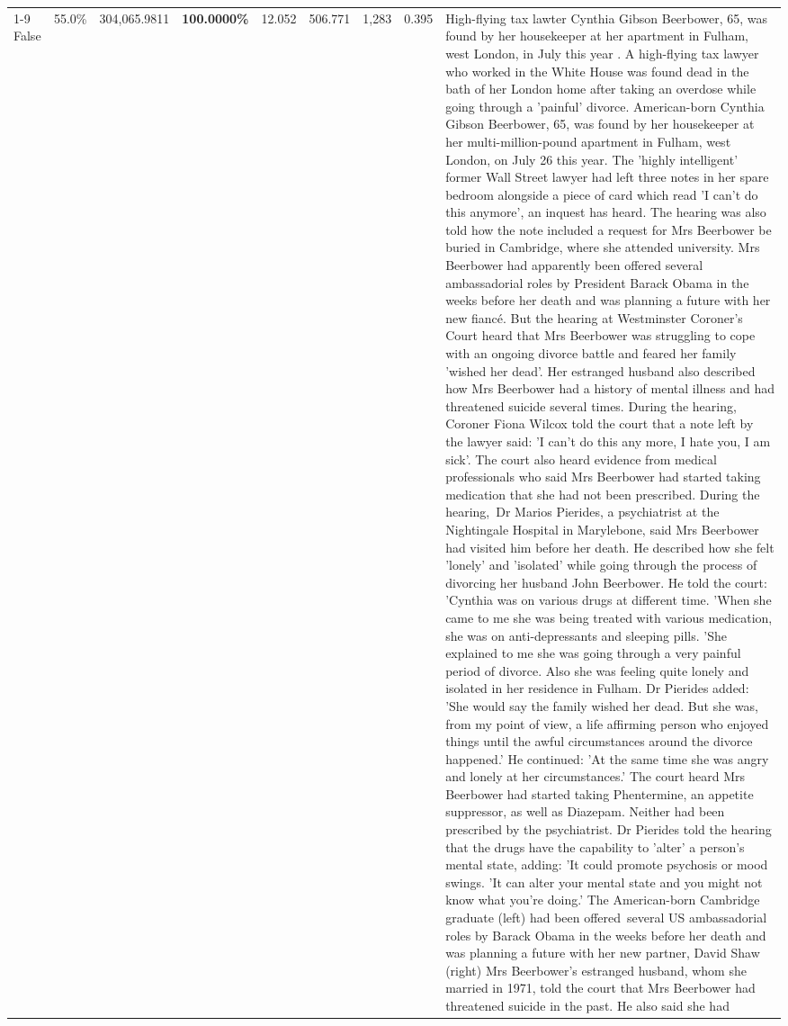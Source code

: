 \begin{table}[H]
\begin{tabular}{lllrlllll}
\cline{1-9}
False & 55.0\% & \color{red} 304,065.9811 & \bfseries \color{red} 100.0000\% & 12.052 & 506.771 & 1,283 & 0.395 & High-flying tax lawter Cynthia Gibson Beerbower, 65, was found by her housekeeper at her apartment in Fulham, west London, in July this year . A high-flying tax lawyer who worked in the White House was found dead in the bath of her London home after taking an overdose while going through a 'painful' divorce. American-born Cynthia Gibson Beerbower, 65, was found by her housekeeper at her multi-million-pound apartment in Fulham, west London, on July 26 this year. The 'highly intelligent' former Wall Street lawyer had left three notes in her spare bedroom alongside a piece of card which read 'I can't do this anymore', an inquest has heard. The hearing was also told how the note included a request for Mrs Beerbower be buried in Cambridge, where she attended university. Mrs Beerbower had apparently been offered several ambassadorial roles by President Barack Obama in the weeks before her death and was planning a future with her new fiancé. But the hearing at Westminster Coroner's Court heard that Mrs Beerbower was struggling to cope with an ongoing divorce battle and feared her family 'wished her dead'. Her estranged husband also described how Mrs Beerbower had a history of mental illness and had threatened suicide several times. During the hearing, Coroner Fiona Wilcox told the court that a note left by the lawyer said: 'I can't do this any more, I hate you, I am sick'. The court also heard evidence from medical professionals who said Mrs Beerbower had started taking medication that she had not been prescribed. During the hearing, Dr Marios Pierides, a psychiatrist at the Nightingale Hospital in Marylebone, said Mrs Beerbower had visited him before her death. He described how she felt 'lonely' and 'isolated' while going through the process of divorcing her husband John Beerbower. He told the court: 'Cynthia was on various drugs at different time. 'When she came to me she was being treated with various medication, she was on anti-depressants and sleeping pills. 'She explained to me she was going through a very painful period of divorce. Also she was feeling quite lonely and isolated in her residence in Fulham. Dr Pierides added: 'She would say the family wished her dead. But she was, from my point of view, a life affirming person who enjoyed things until the awful circumstances around the divorce happened.' He continued: 'At the same time she was angry and lonely at her circumstances.' The court heard Mrs Beerbower had started taking Phentermine, an appetite suppressor, as well as Diazepam. Neither had been prescribed by the psychiatrist. Dr Pierides told the hearing that the drugs have the capability to 'alter' a person's mental state, adding: 'It could promote psychosis or mood swings. 'It can alter your mental state and you might not know what you're doing.' The American-born Cambridge graduate (left) had been offered several US ambassadorial roles by Barack Obama in the weeks before her death and was planning a future with her new partner, David Shaw (right) Mrs Beerbower's estranged husband, whom she married in 1971, told the court that Mrs Beerbower had threatened suicide in the past. He also said she had 
\end{tabular}
\end{table}
